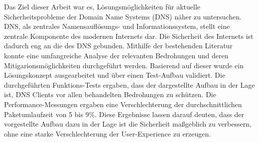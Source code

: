
Das Ziel dieser Arbeit war es, Lösungsmöglichkeiten für aktuelle Sicherheitsprobleme der Domain Name Systems (DNS) näher zu untersuchen. DNS, als zentrales Namensauflösungs- und Informationssystem, stellt eine zentrale Komponente des modernen Internets dar. Die Sicherheit des Internets ist dadurch eng an die des DNS gebunden. Mithilfe der bestehenden Literatur konnte eine umfangreiche Analyse der relevanten Bedrohungen und deren Mitigarionsmöglichkeiten durchgeführt werden. Basierend auf dieser wurde ein Lösungskonzept ausgearbeitet und über einen Test-Aufbau validiert. Die durchgeführten Funktions-Tests ergaben, dass der dargestellte Aufbau in der Lage ist, DNS Clients vor allen behandelten Bedrohungen zu schützen. Die Performance-Messungen ergaben eine Verschlechterung der durchschnittlichen Paketumlaufzeit von 5 bis 9\%. Diese Ergebnisse lassen darauf deuten, dass der vorgestellte Aufbau dazu in der Lage ist die Sicherheit maßgeblich zu verbessern, ohne eine starke Verschlechterung der User-Experience zu erzeugen.